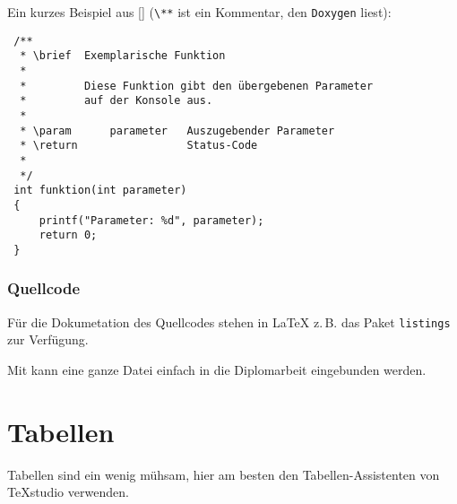			Ein kurzes Beispiel aus [\cite[S.3]{wiki_doxygen}] (\verb"\**" ist ein Kommentar, den \verb"Doxygen" liest):	   		
\begin{verbatim}
 /**
  * \brief  Exemplarische Funktion
  *
  *         Diese Funktion gibt den übergebenen Parameter
  *         auf der Konsole aus.
  *
  * \param      parameter   Auszugebender Parameter
  * \return                 Status-Code
  *
  */
 int funktion(int parameter)
 {
     printf("Parameter: %d", parameter);
     return 0;
 }
\end{verbatim}	   		
	   		
   		\subsubsection{Quellcode}
   			Für die Dokumetation des Quellcodes stehen in \LaTeX{} z.\,B. das Paket \verb"listings" zur Verfügung.
   			
   			Mit \verb"" kann eine ganze Datei einfach in die Diplomarbeit eingebunden werden.
   			  
   		
		
	\section{Tabellen}
		Tabellen sind ein wenig mühsam, hier am besten den Tabellen-Assistenten von TeXstudio verwenden.